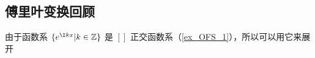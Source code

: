 

\subsection{傅里叶变换回顾}
由于函数系 $\{ e^{\I kx}{\huge|}k\in\mathbb Z\}$ 是 $[]$ 正交函数系（\autoref{ex_OFS_1}），所以可以用它来展开





















